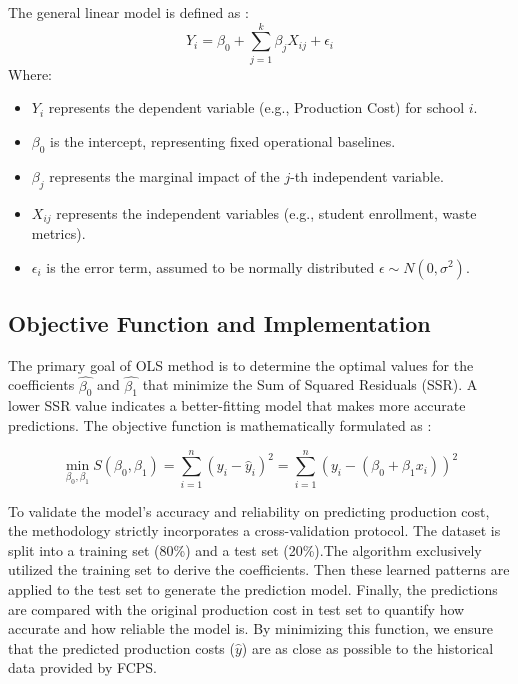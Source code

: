 \documentclass[journal]{IEEEtran}
\begin{document}
The general linear model is defined as \cite{James2021ISL}:
\begin{equation}
    Y_i = \beta_0 + \sum_{j=1}^{k} \beta_j X_{ij} + \epsilon_i
\end{equation}
Where:
\begin{itemize}
    \item $Y_i$ represents the dependent variable (e.g., Production Cost) for school $i$.
    \item $\beta_0$ is the intercept, representing fixed operational baselines.
    \item $\beta_j$ represents the marginal impact of the $j$-th independent variable.
    \item $X_{ij}$ represents the independent variables (e.g., student enrollment, waste metrics).
    \item $\epsilon_i$ is the error term, assumed to be normally distributed $\epsilon \sim N(0, \sigma^2)$.
\end{itemize}


\subsection{Objective Function and Implementation}

The primary goal of OLS method is to determine the optimal values for the coefficients $\hat{\beta_0}$ and $\hat{\beta_1}$ that minimize the Sum of Squared Residuals (SSR). A lower SSR value indicates a better-fitting model that makes more accurate predictions. The objective function is mathematically formulated as \cite{jameslr}:

\begin{equation}
    \min_{\beta_0, \beta_1} S(\beta_0, \beta_1) = \sum_{i=1}^{n} (y_i - \hat{y}_i)^2 = \sum_{i=1}^{n} (y_i - (\beta_0 + \beta_1 x_i))^2
    \label{eq:ols_obj}
\end{equation}


To validate the model’s accuracy and reliability on predicting production cost, the methodology strictly incorporates a cross-validation protocol. The dataset is split into a training set (80\%) and a test set (20\%).The algorithm exclusively utilized the training set to derive the coefficients. Then these learned patterns are applied to the test set to generate the prediction model. Finally, the predictions are compared with the original production cost in test set to quantify how accurate and how reliable the model is. By minimizing this function, we ensure that the predicted production costs ($\hat{y}$) are as close as possible to the historical data provided by FCPS.
\end{document}
